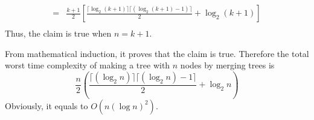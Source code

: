 \documentclass[fleqn,a4paper,12pt]{article}
\begin{document}
\begin{enumerate}
\begin{itemize}
\begin{align*}
       =& \frac{k+1}{2} [\frac{ \lceil \log_2 (k+1) \rceil \lceil (\log_2 (k+1) - 1 ) \rceil }{2} + \log_2 (k+1)  ]\\
     \end{align*}
     Thus, the claim is true when $n=k+1$.
  \end{itemize}
  From mathematical induction, it proves that the claim is true.
  Therefore the total worst time complexity of making a tree with $n$ nodes by merging trees is 
  \[\frac{n}{2} ( \frac{ \lceil (\log_2 n) \rceil \lceil (\log_2 n) - 1 \rceil }{2} + \log_2 n )\]
  Obviously, it equals to $O( n ( \log n )^2 )$.
\end{enumerate}
\end{document}
